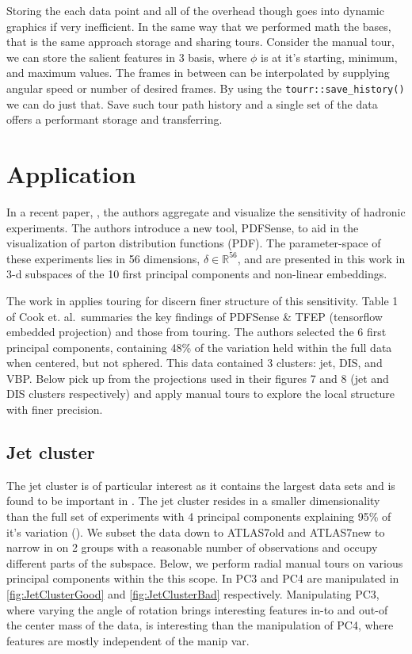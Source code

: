 \documentclass{monashthesis}
\begin{document}
Storing the each data point and all of the overhead though goes into dynamic graphics if very inefficient. In the same way that we performed math the bases, that is the same approach storage and sharing tours. Consider the manual tour, we can store the salient features in 3 basis, where \(\phi\) is at it's starting, minimum, and maximum values. The frames in between can be interpolated by supplying angular speed or number of desired frames. By using the \texttt{tourr::save\_history()} we can do just that. Save such tour path history and a single set of the data offers a performant storage and transferring.

\hypertarget{sec:application}{%
\section{Application}\label{sec:application}}

In a recent paper, \textcite{wang_visualizing_2018}, the authors aggregate and visualize the sensitivity of hadronic experiments. The authors introduce a new tool, PDFSense, to aid in the visualization of parton distribution functions (PDF). The parameter-space of these experiments lies in 56 dimensions, \(\delta \in \mathbb{R}^{56}\), and are presented in this work in 3-d subspaces of the 10 first principal components and non-linear embeddings.

The work in \textcite{cook_dynamical_2018} applies touring for discern finer structure of this sensitivity. Table 1 of Cook et. al.~summaries the key findings of PDFSense \& TFEP (tensorflow embedded projection) and those from touring. The authors selected the 6 first principal components, containing 48\% of the variation held within the full data when centered, but not sphered. This data contained 3 clusters: jet, DIS, and VBP. Below pick up from the projections used in their figures 7 and 8 (jet and DIS clusters respectively) and apply manual tours to explore the local structure with finer precision.

\hypertarget{jet-cluster}{%
\subsection{Jet cluster}\label{jet-cluster}}

The jet cluster is of particular interest as it contains the largest data sets and is found to be important in \textcite{wang_visualizing_2018}. The jet cluster resides in a smaller dimensionality than the full set of experiments with 4 principal components explaining 95\% of it's variation (\textcite{cook_dynamical_2018}). We subset the data down to ATLAS7old and ATLAS7new to narrow in on 2 groups with a reasonable number of observations and occupy different parts of the subspace. Below, we perform radial manual tours on various principal components within the this scope. In PC3 and PC4 are manipulated in \ref{fig:JetClusterGood} and \ref{fig:JetClusterBad} respectively. Manipulating PC3, where varying the angle of rotation brings interesting features in-to and out-of the center mass of the data, is interesting than the manipulation of PC4, where features are mostly independent of the manip var.
\end{document}
